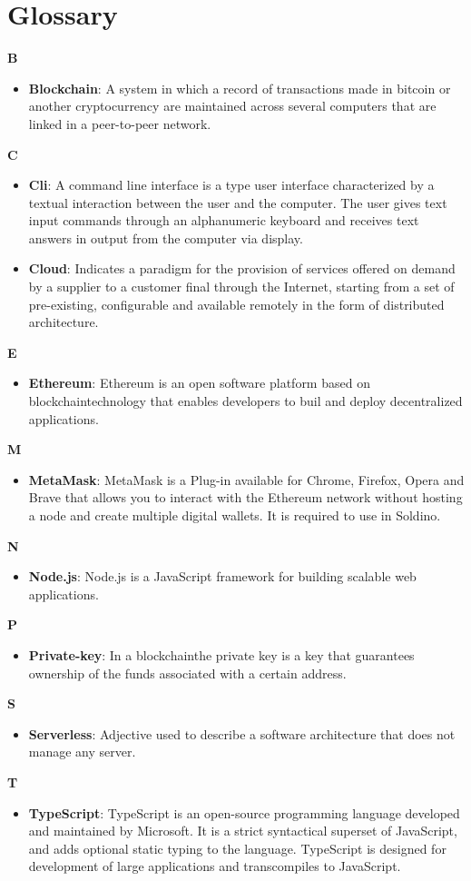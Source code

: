 \section{Glossary}
\textbf{B}
\begin{itemize}
	\item \textbf{Blockchain}: A system in which a record of transactions made in bitcoin or another cryptocurrency are maintained across several computers that are linked in a peer-to-peer network.
\end{itemize}
\textbf{C}
\begin{itemize}
	\item \textbf{Cli}: A command line interface is a type user interface characterized by a textual interaction between the user and the computer. The user gives text input commands through an alphanumeric keyboard and receives text answers in output from the computer via display.
	\item \textbf{Cloud}: Indicates a paradigm for the provision of services offered on demand by a supplier to a customer
	final through the Internet, starting from a set of pre-existing, configurable and
	available remotely in the form of distributed architecture.
\end{itemize}
\textbf{E}
\begin{itemize}
	\item \textbf{Ethereum}: Ethereum is an open software platform based on blockchain\glo technology that enables developers to buil and deploy decentralized applications.
\end{itemize}
\textbf{M}
\begin{itemize}
	\item \textbf{MetaMask}: MetaMask is a Plug-in available for Chrome, Firefox, Opera and Brave that allows you to interact with the Ethereum network without hosting a node and create multiple digital wallets. It is required to use in Soldino.
\end{itemize}
\textbf{N}
\begin{itemize}
	\item \textbf{Node.js}: Node.js is a JavaScript framework for building scalable web applications.
\end{itemize}
\textbf{P}
\begin{itemize}
	\item \textbf{Private-key}: In a blockchain\glo the private key is a key that guarantees ownership of the funds associated with
	a certain address.
\end{itemize}
\textbf{S}
\begin{itemize}
	\item \textbf{Serverless}: Adjective used to describe a software architecture that does not manage any server.
\end{itemize}
\textbf{T}
\begin{itemize}
	\item \textbf{TypeScript}: TypeScript is an open-source programming language developed and maintained by Microsoft. It is a strict syntactical superset of JavaScript, and adds optional static typing to the language. TypeScript is designed for development of large applications and transcompiles to JavaScript.
\end{itemize}
